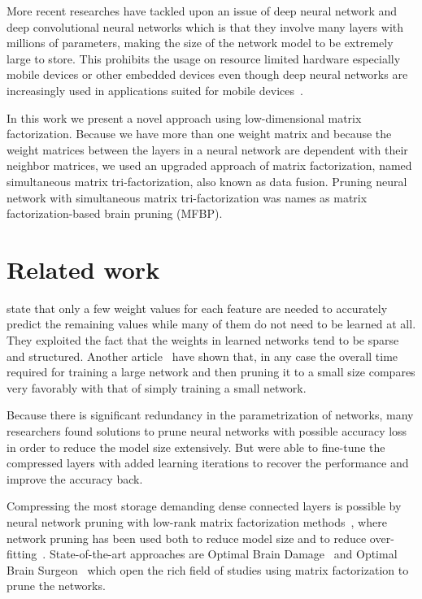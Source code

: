 \documentclass{article} %
\begin{document}
More recent researches have tackled upon an issue of deep neural network and
deep convolutional neural networks which is that they involve many layers with
millions of parameters, making the size of the network model to be extremely
large to store. This prohibits the usage on resource limited hardware
especially mobile devices or other embedded devices even though deep neural
networks are increasingly used in applications suited for mobile
devices~\cite{DBLP:journals/corr/GongLYB14}.

In this work we present a novel approach using low-dimensional matrix
factorization. Because we have more than one weight matrix and because the
weight matrices between the layers in a neural network are dependent with their
neighbor matrices, we used an upgraded approach of matrix factorization, named
simultaneous matrix tri-factorization, also known as data fusion. Pruning
neural network with simultaneous matrix tri-factorization was names as matrix
factorization-based brain pruning (MFBP).


\section{Related work}

\citet{denil2013predicting} state that only a few weight values for each
feature are needed to accurately predict the remaining values while many of
them do not need to be learned at all. They exploited the fact that the weights
in learned networks tend to be sparse and structured. Another
article~\cite{augasta2013pruning} have shown that, in any case the overall time
required for training a large network and then pruning it to a small size
compares very favorably with that of simply training a small network.

Because there is significant redundancy in the parametrization of networks,
many researchers found solutions to prune neural networks with possible
accuracy loss in order to reduce the model size extensively. But were able to
fine-tune the compressed layers with added learning iterations to recover the
performance and improve the accuracy back.

Compressing the most storage demanding dense connected layers is possible by
neural network pruning with low-rank matrix factorization
methods~\cite{bondarenko2014artificial, schmidhuber2015deep, sainath2013low},
where network pruning has been used both to reduce model size and to reduce
over-fitting~\cite{han2015learning}. State-of-the-art approaches are Optimal
Brain Damage~\cite{lecun1989optimal} and Optimal Brain
Surgeon~\cite{hassibi1993optimal} which open the rich field of studies using
matrix factorization to prune the networks.
\end{document}
